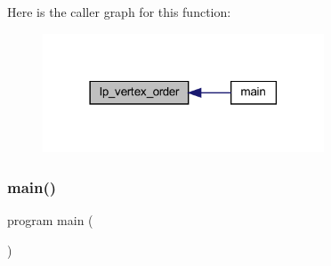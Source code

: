 Here is the caller graph for this function\+:
\nopagebreak
\begin{figure}[H]
\begin{center}
\leavevmode
\includegraphics[width=237pt]{Marco_8f90_acbb31184506555aa865f529467a59933_icgraph}
\end{center}
\end{figure}
\mbox{\label{Marco_8f90_a8ec2266d83cd6c0b762cbcbc92c0af3d}} 
\subsubsection{\texorpdfstring{main()}{main()}}
{\footnotesize\ttfamily program main (\begin{DoxyParamCaption}{ }\end{DoxyParamCaption})}

